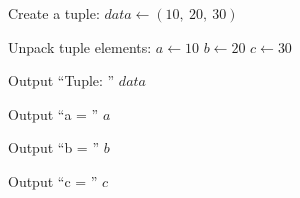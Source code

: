 \begin{algorithm}
\caption{Unpack Elements of a Tuple}
\begin{algorithmic}[1]

\STATE Create a tuple:
\STATE $data \gets (10,\ 20,\ 30)$

\STATE Unpack tuple elements:
\STATE $a \gets 10$
\STATE $b \gets 20$
\STATE $c \gets 30$

\STATE Output ``Tuple: '' $data$

\STATE Output ``a = '' $a$

\STATE Output ``b = '' $b$

\STATE Output ``c = '' $c$

\end{algorithmic}
\end{algorithm}
